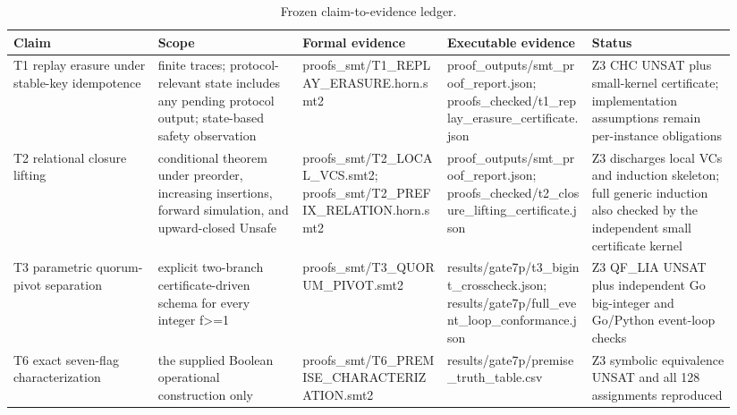 \begin{table}[t]
\centering
\small
\begin{tabular}{p{0.188\linewidth}p{0.188\linewidth}p{0.188\linewidth}p{0.188\linewidth}p{0.188\linewidth}}
\toprule
Claim & Scope & Formal evidence & Executable evidence & Status \\
\midrule
T1 replay erasure under stable-key idempotence & finite traces; protocol-relevant state includes any pending protocol output; state-based safety observation & proofs\_smt/T1\_REPLAY\_ERASURE.horn.smt2 & proof\_outputs/smt\_proof\_report.json; proofs\_checked/t1\_replay\_erasure\_certificate.json & Z3 CHC UNSAT plus small-kernel certificate; implementation assumptions remain per-instance obligations \\
T2 relational closure lifting & conditional theorem under preorder, increasing insertions, forward simulation, and upward-closed Unsafe & proofs\_smt/T2\_LOCAL\_VCS.smt2; proofs\_smt/T2\_PREFIX\_RELATION.horn.smt2 & proof\_outputs/smt\_proof\_report.json; proofs\_checked/t2\_closure\_lifting\_certificate.json & Z3 discharges local VCs and induction skeleton; full generic induction also checked by the independent small certificate kernel \\
T3 parametric quorum-pivot separation & explicit two-branch certificate-driven schema for every integer f>=1 & proofs\_smt/T3\_QUORUM\_PIVOT.smt2 & results/gate7p/t3\_bigint\_crosscheck.json; results/gate7p/full\_event\_loop\_conformance.json & Z3 QF\_LIA UNSAT plus independent Go big-integer and Go/Python event-loop checks \\
T6 exact seven-flag characterization & the supplied Boolean operational construction only & proofs\_smt/T6\_PREMISE\_CHARACTERIZATION.smt2 & results/gate7p/premise\_truth\_table.csv & Z3 symbolic equivalence UNSAT and all 128 assignments reproduced \\
\bottomrule
\end{tabular}
\caption{Frozen claim-to-evidence ledger.}
\label{tab:table5_claim_to_evidence}
\end{table}
